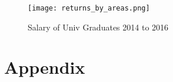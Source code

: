 \documentclass[alpha-refs]{wiley-article-05g}
\begin{document}
\vspace{-0.2in}

\begin{center}
	\begin{figure}[htbp!]
\begin{minipage}[b]{1\linewidth}
			\centering
			\texttt{[image: returns\_by\_areas.png]}
		\end{minipage}
			\caption{Salary of Univ Graduates 2014 to 2016}\label{fig:1.18}
	\end{figure}
\end{center}


\newpage

\printbibliography

\newpage
\section*{Appendix}
%

\setcounter{table}{0}
\renewcommand{\thetable}{A\arabic{table}}

\setcounter{figure}{0}
\renewcommand{\thefigure}{A\arabic{figure}}
\end{document}
